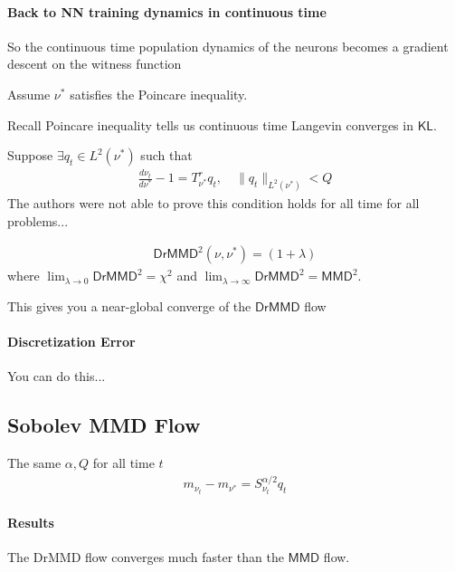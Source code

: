 \documentclass[11pt,fleqn]{article}
\numberwithin{equation}{section}
\theoremstyle{definition}
\theoremstyle{definition}
\begin{document}
\paragraph{Back to NN training dynamics in continuous time}
So the continuous time population dynamics of the neurons becomes a gradient descent on the witness function
\begin{assumption}
	Assume $\nu^*$ satisfies the Poincare inequality. 
\end{assumption}
\begin{sidework}
	Recall Poincare inequality tells us continuous time Langevin converges in $\textsf{KL}$.
\end{sidework}
\begin{assumption}
	Suppose $\exists q_t \in L^2(\nu^*)$ such that
	\begin{align}
		\frac{d\nu_t}{d\nu^*} - 1 = T_{\nu^*}^r q_t, \quad \| q_t \|_{L^2(\nu^*)} < Q
	\end{align}
	The authors were not able to prove this condition holds for all time for all problems...
\end{assumption}


\begin{definition}
	\begin{align}
		\textsf{DrMMD}^2(\nu, \nu^*) = (1 + \lambda) 
	\end{align}
	where $\lim_{\lambda \to 0} \textsf{DrMMD}^2 = \chi^2$ and $\lim_{\lambda \to \infty} \textsf{DrMMD}^2 = \textsf{MMD}^2$.
\end{definition}
This gives you a near-global converge of the $\textsf{DrMMD}$ flow


\paragraph{Discretization Error}
You can do this...

\subsection{Sobolev MMD Flow}
\begin{assumption}
	The same $\alpha, Q$ for all time $t$
	\begin{align}
		m_{\nu_t} - m_{\nu^*} = S_{\nu_t}^{\alpha/2} q_t
	\end{align}
\end{assumption}

\paragraph{Results}
The \textsf{DrMMD} flow converges much faster than the $\textsf{MMD}$ flow.
\end{document}
